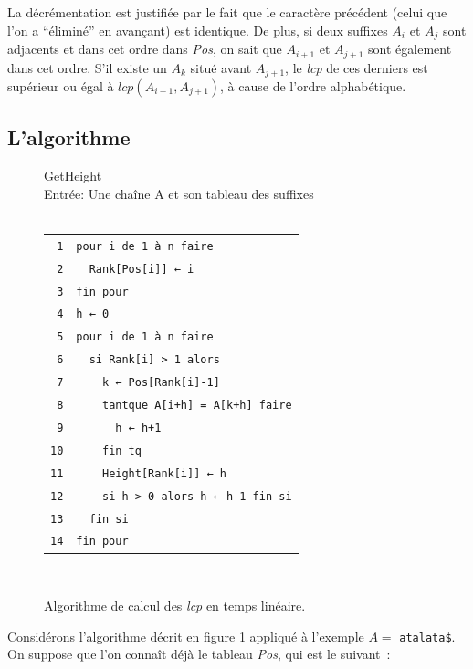 \documentclass[a4paper,10pt]{article}
\begin{document}
La décrémentation est justifiée par le fait que le caractère précédent
(celui que l'on a ``éliminé'' en avançant) est identique. De plus, si
deux suffixes $A_i$ et $A_j$ sont adjacents et dans cet ordre dans
\textit{Pos}, on sait que $A_{i+1}$ et $A_{j+1}$ sont également dans
cet ordre. S'il existe un $A_k$ situé avant $A_{j+1}$, le \textit{lcp}
de ces derniers est supérieur ou égal à $\mathit{lcp}(A_{i+1},
A_{j+1})$, à cause de l'ordre alphabétique.


\pagebreak
\subsection{L'algorithme}
\label{sec:algo}

\begin{figure}[h]
  GetHeight\\
  Entrée: Une chaîne A et son tableau des suffixes\\ \hfill \\
  \begin{tabular}{r|l}
    \texttt{1}  & \verb!pour i de 1 à n faire!\\
    \texttt{2}  & \verb!  Rank[Pos[i]] ← i!\\
    \texttt{3}  & \verb!fin pour!\\
    \texttt{4}  & \verb!h ← 0!\\
    \texttt{5}  & \verb!pour i de 1 à n faire!\\
    \texttt{6}  & \verb!  si Rank[i] > 1 alors!\\
    \texttt{7}  & \verb!    k ← Pos[Rank[i]-1]!\\
    \texttt{8}  & \verb!    tantque A[i+h] = A[k+h] faire!\\
    \texttt{9}  & \verb!      h ← h+1!\\
    \texttt{10} & \verb!    fin tq!\\
    \texttt{11} & \verb!    Height[Rank[i]] ← h!\\
    \texttt{12} & \verb!    si h > 0 alors h ← h-1 fin si!\\
    \texttt{13} & \verb!  fin si!\\
    \texttt{14} & \verb!fin pour!\\
  \end{tabular}\\
  \caption{Algorithme de calcul des \textit{lcp} en temps linéaire.}
  \label{fig:getheight}
\end{figure}

Considérons l'algorithme décrit en figure \ref{fig:getheight} appliqué
à l'exemple $A =$ \texttt{atalata\$}. On suppose que l'on connaît déjà
le tableau \textit{Pos}, qui est le suivant~:
\end{document}
